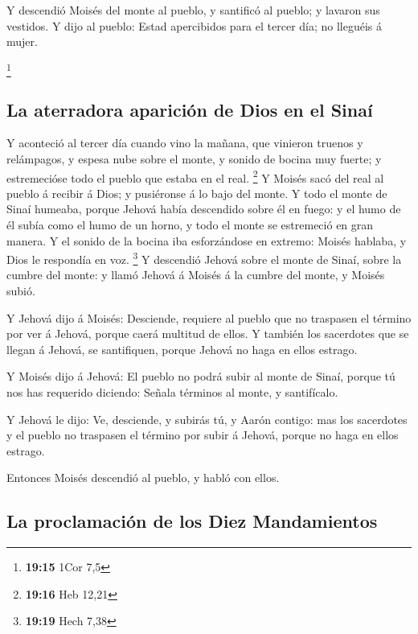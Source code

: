  Y descendió Moisés del monte al pueblo, y santificó al
pueblo; y lavaron sus vestidos.  Y dijo al pueblo: Estad
apercibidos para el tercer día; no lleguéis á mujer.

\footnote{\textbf{19:15} 1Cor 7,5}

\hypertarget{la-aterradora-apariciuxf3n-de-dios-en-el-sinauxed}{%
\subsection{La aterradora aparición de Dios en el
Sinaí}\label{la-aterradora-apariciuxf3n-de-dios-en-el-sinauxed}}

 Y aconteció al tercer día cuando vino la mañana, que
vinieron truenos y relámpagos, y espesa nube sobre el monte, y sonido de
bocina muy fuerte; y estremecióse todo el pueblo que estaba en el real.
\footnote{\textbf{19:16} Heb 12,21}  Y Moisés sacó del real
al pueblo á recibir á Dios; y pusiéronse á lo bajo del monte.
 Y todo el monte de Sinaí humeaba, porque Jehová había
descendido sobre él en fuego: y el humo de él subía como el humo de un
horno, y todo el monte se estremeció en gran manera.  Y el
sonido de la bocina iba esforzándose en extremo: Moisés hablaba, y Dios
le respondía en voz. \footnote{\textbf{19:19} Hech 7,38}  Y
descendió Jehová sobre el monte de Sinaí, sobre la cumbre del monte: y
llamó Jehová á Moisés á la cumbre del monte, y Moisés subió.

 Y Jehová dijo á Moisés: Desciende, requiere al pueblo que
no traspasen el término por ver á Jehová, porque caerá multitud de
ellos.  Y también los sacerdotes que se llegan á Jehová, se
santifiquen, porque Jehová no haga en ellos estrago.

 Y Moisés dijo á Jehová: El pueblo no podrá subir al monte
de Sinaí, porque tú nos has requerido diciendo: Señala términos al
monte, y santifícalo.

 Y Jehová le dijo: Ve, desciende, y subirás tú, y Aarón
contigo: mas los sacerdotes y el pueblo no traspasen el término por
subir á Jehová, porque no haga en ellos estrago.

 Entonces Moisés descendió al pueblo, y habló con ellos.

\hypertarget{la-proclamaciuxf3n-de-los-diez-mandamientos}{%
\subsection{La proclamación de los Diez
Mandamientos}\label{la-proclamaciuxf3n-de-los-diez-mandamientos}}

